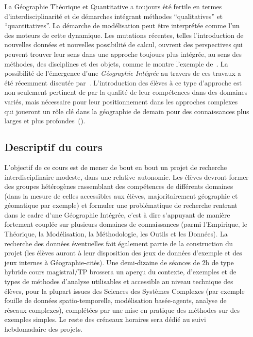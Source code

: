 \documentclass[11pt]{article}
\begin{document}
La Géographie Théorique et Quantitative a toujours été fertile en termes d'interdisciplinarité et de démarches intégrant méthodes ``qualitatives'' et ``quantitatives''. La démarche de modélisation peut être interprétée comme l'un des moteurs de cette dynamique. Les mutations récentes, telles l'introduction de nouvelles données et nouvelles possibilité de calcul, ouvrent des perspectives qui peuvent trouver leur sens dans une approche toujours plus intégrée, au sens des méthodes, des disciplines et des objets, comme le montre l'exemple de~\cite{pumain2017urban}. La possibilité de l'émergence d'une \emph{Géographie Intégrée} au travers de ces travaux a été récemment discutée par~\cite{raimbault:halshs-01505084}. L'introduction des élèves à ce type d'approche est non seulement pertinent de par la qualité de leur compétences dans des domaines variés, mais nécessaire pour leur positionnement dans les approches complexes qui joueront un rôle clé dans la géographie de demain pour des connaissances plus larges et plus profondes~(\cite{banos2017knowledge}).




\subsection*{Descriptif du cours}

L'objectif de ce cours est de mener de bout en bout un projet de recherche interdisciplinaire modeste, dans une relative autonomie. Les élèves devront former des groupes hétérogènes rassemblant des compétences de différents domaines (dans la mesure de celles accessibles aux élèves, majoritairement géographie et géomatique par exemple) et formuler une problématique de recherche rentrant dans le cadre d'une Géographie Intégrée, c'est à dire s'appuyant de manière fortement couplée sur plusieurs domaines de connaissances (parmi l'Empirique, le Théorique, la Modélisation, la Méthodologie, les Outils et les Données). La recherche des données éventuelles fait également partie de la construction du projet (les élèves auront à leur disposition des jeux de données d'exemple et des jeux internes à Géographie-cités). Une demi-dizaine de séances de 2h de type hybride cours magistral/TP brossera un aperçu du contexte, d'exemples et de types de méthodes d'analyse utilisables et accessible au niveau technique des élèves, pour la plupart issues des Sciences des Systèmes Complexes (par exemple fouille de données spatio-temporelle, modélisation basée-agents, analyse de réseaux complexes), complétées par une mise en pratique des méthodes sur des exemples simples. Le reste des créneaux horaires sera dédié au suivi hebdomadaire des projets.
\end{document}
